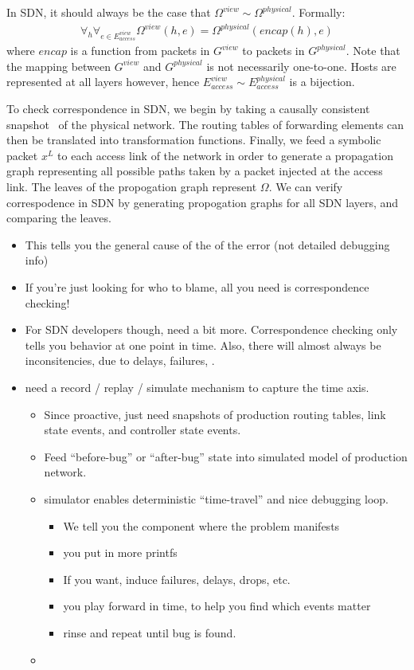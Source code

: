In SDN, it should always be the case that 
$\Omega^{view} \sim \Omega^{physical}$. Formally:
\begin{align*}
\forall_{h} \forall_{e \in E_{access}^{view}} \Omega^{view}(h,e) =
\Omega^{physical}(encap(h),e) 
\end{align*}
where $encap$ is a function from packets in $G^{view}$ to packets in
$G^{physical}$. Note that the mapping between $G^{view}$ and $G^{physical}$ is not
necessarily one-to-one. Hosts are represented at all layers however, hence
$E_{access}^{view} \sim E_{access}^{physical}$ is a bijection.

To check correspondence in SDN, we begin by taking a causally consistent
snapshot~\cite{Chandy:1985:DSD:214451.214456} of the physical network. The routing
tables of forwarding elements can then be translated into transformation functions.
Finally, we feed a symbolic packet $x^L$ to each access link of the network in
order to generate
a propagation graph representing all possible paths taken by a packet injected
at the access link. The leaves of the propogation graph represent $\Omega$. We
can verify correspodence in SDN by generating propogation graphs for all SDN layers,
and comparing the leaves.

\begin{itemize}
\item This tells you the general cause of the of the error (not detailed
debugging info)
\item If you're just looking for who to blame, all you need is correspondence
checking!
\item For SDN developers though, need a bit more. Correspondence checking only tells you behavior at one point in time.
Also, there will almost always be inconsitencies, due to delays, failures,
\etc.
\item {} need a record / replay / simulate mechanism to capture the time axis.
    \begin{itemize}
    \item Since proactive, just need snapshots of production routing tables,
    link state events, and controller state events.
    \item Feed ``before-bug'' or ``after-bug'' state into simulated model of production network. 
    \item simulator enables deterministic ``time-travel'' and nice debugging
    loop.
        \begin{itemize}
        \item We tell you the component where the problem manifests
        \item you put in more printfs
        \item If you want, induce failures, delays, drops, etc.
        \item you play forward in time, to help you find which events matter
        \item rinse and repeat until bug is found.
        \end{itemize}
    \item {}
    \end{itemize}
\end{itemize}

